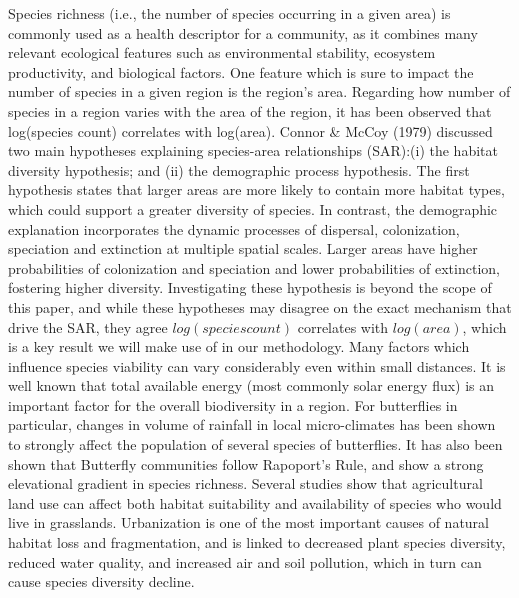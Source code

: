 \documentclass[prl,showpacs,superscriptaddress,twocolumn,longbibliography]{revtex4-1}
\begin{document}

Species richness (i.e., the number of species occurring in a given area) is commonly used as a health descriptor for a community, as it combines many relevant ecological features such as environmental stability, ecosystem productivity, and biological factors\cite{Park2003}.
\newline
\newline
One feature which is sure to impact the number of species in a given region is the region's area. Regarding how number of species in a region varies with the area of the region, it has been observed that log(species count) correlates with log(area)\cite{connor_2001_sar}. Connor \& McCoy (1979) discussed two main hypotheses explaining species-area relationships (SAR):(i) the habitat diversity hypothesis; and (ii) the demographic process hypothesis. The first hypothesis states that larger areas are more likely to contain more habitat types, which could support a greater diversity of species. In contrast, the demographic explanation incorporates the dynamic processes of dispersal, colonization, speciation and extinction at multiple spatial scales. Larger areas have higher probabilities of colonization and speciation and lower probabilities of extinction, fostering higher diversity\cite{Drakare2006}.  Investigating these hypothesis is beyond the scope of this paper, and while these hypotheses may disagree on the exact mechanism that drive the SAR, they agree $log(species count)$ correlates with $log(area)$, which is a key result we will make use of in our methodology.
\newline
\newline
Many factors which influence species viability can vary considerably even within small distances\cite{john_wiley__sons_ltd_species_2007}. It is well known that total available energy (most commonly solar energy flux) is an important factor for the overall biodiversity in a region\cite{hawkins_energy_2003, currie_energy_1991}. For butterflies in particular, changes in volume of rainfall in local micro-climates has been shown to strongly affect the population of several species of butterflies\cite{Haneda2019}. It has also been shown that Butterfly communities follow Rapoport's Rule, and show a strong elevational gradient in species richness\cite{Fleishman1998, Arturo}. 
\newline
\newline
Several studies show that agricultural land use can affect both habitat suitability and availability of species who would live in grasslands\cite{smith}. Urbanization is one of the most important causes of natural habitat loss and fragmentation, and is linked to decreased plant species diversity, reduced water quality, and increased air and soil pollution, which in turn can cause species diversity decline\cite{smith,Tzortzakaki2019}. 
\end{document}
